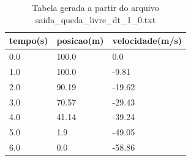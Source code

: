 \begin{table}
\caption{Tabela gerada a partir do arquivo saida\_queda\_livre\_dt\_1\_0.txt}
\label{tab:saida_queda_livre_dt_1_0}
\begin{tabular}{lll}
\toprule
tempo(s) & posicao(m) & velocidade(m/s) \\
\midrule
0.0 & 100.0 & 0.0 \\
1.0 & 100.0 & -9.81 \\
2.0 & 90.19 & -19.62 \\
3.0 & 70.57 & -29.43 \\
4.0 & 41.14 & -39.24 \\
5.0 & 1.9 & -49.05 \\
6.0 & 0.0 & -58.86 \\
\bottomrule
\end{tabular}
\end{table}
